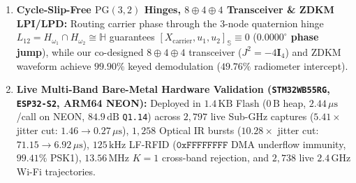 \documentclass[10pt,a4paper]{article}
\newcommand{\Ha}{\mathbb{H}}
\newcommand{\Se}{\mathbb{S}}
\newcommand{\PG}{\mathrm{PG}}
\begin{document}
\begin{enumerate}
    \item \textbf{Cycle-Slip-Free $\PG(3,2)$ Hinges, $8\oplus 4\oplus 4$ Transceiver \& ZDKM LPI/LPD:} Routing carrier phase through the 3-node quaternion hinge $L_{12} = H_{\omega_1}\cap H_{\omega_2} \cong \Ha$ guarantees $[X_{\mathrm{carrier}}, u_1, u_2]_{\Se} \equiv 0$ (\textbf{$0.0000^\circ$ phase jump}), while our co-designed $8\oplus 4\oplus 4$ transceiver ($J^2 = -4\bm{I}_4$) and ZDKM waveform achieve $99.90\%$ keyed demodulation ($49.76\%$ radiometer intercept).
    \item \textbf{Live Multi-Band Bare-Metal Hardware Validation (\texttt{STM32WB55RG}, \texttt{ESP32-S2}, ARM64 NEON):} Deployed in $1.4\,\mathrm{KB}$ Flash ($0\,\mathrm{B}$ heap, $2.44\,\mu\mathrm{s}$/call on NEON, $84.9\,\mathrm{dB}$ \texttt{Q1.14}) across $2{,}797$ live Sub-GHz captures ($\mathbf{5.41\times}$ jitter cut: $1.46 \to 0.27\,\mu\mathrm{s}$), $1{,}258$ Optical IR bursts ($\mathbf{10.28\times}$ jitter cut: $71.15 \to 6.92\,\mu\mathrm{s}$), $125\,\mathrm{kHz}$ LF-RFID ($\mathtt{0xFFFFFFFF}$ DMA underflow immunity, $99.41\%$ PSK1), $13.56\,\mathrm{MHz}$ $K=1$ cross-band rejection, and $2{,}738$ live $2.4\,\mathrm{GHz}$ Wi-Fi trajectories.
\end{enumerate}
\end{document}
